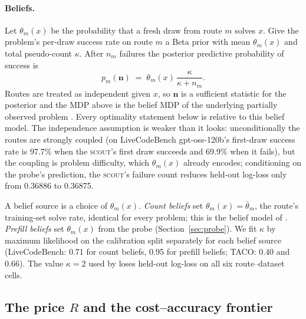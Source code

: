 \documentclass[10pt]{article} %
\newcommand{\scout}{\textsc{scout}\xspace}
\begin{document}
\paragraph{Beliefs.}
Let $\theta_m(x)$ be the probability that a fresh draw from route $m$ solves $x$.  Give the
problem's per-draw success rate on route $m$ a Beta prior with mean $\theta_m(x)$ and total
pseudo-count $\kappa$.  After $n_m$ failures the posterior predictive probability of success is
\[
p_m(\mathbf n) \;=\; \theta_m(x)\,\frac{\kappa}{\kappa+n_m}.
\]
Routes are treated as independent given $x$, so $\mathbf n$ is a sufficient statistic for the
posterior and the MDP above is the belief MDP of the underlying partially observed problem
\citep{kaelbling1998planning}.  Every optimality statement below is relative to this belief
model.  The independence assumption is weaker than it looks: unconditionally the routes are
strongly coupled (on LiveCodeBench gpt-oss-120b's first-draw success rate is 97.7\% when the
\scout's first draw succeeds and 69.9\% when it fails), but the coupling is problem difficulty,
which $\theta_m(x)$ already encodes; conditioning on the probe's prediction, the \scout's
failure count reduces held-out log-loss only from 0.36886 to 0.36875.

A belief source is a choice of $\theta_m(x)$.  \emph{Count beliefs} set $\theta_m(x)=\bar\theta_m$,
the route's training-set solve rate, identical for every problem; this is the belief model of
\citet{chen2026ror}.  \emph{Prefill beliefs} set $\theta_m(x)$ from the probe
(Section~\ref{sec:probe}).  We fit $\kappa$ by maximum likelihood on the calibration split
separately for each belief source (LiveCodeBench: 0.71 for count beliefs, 0.95 for prefill
beliefs; TACO: 0.40 and 0.66).  The value $\kappa=2$ used by \citet{chen2026ror} loses held-out
log-loss on all six route--dataset cells.

\subsection{The price $R$ and the cost--accuracy frontier}
\label{sec:price}
\end{document}
